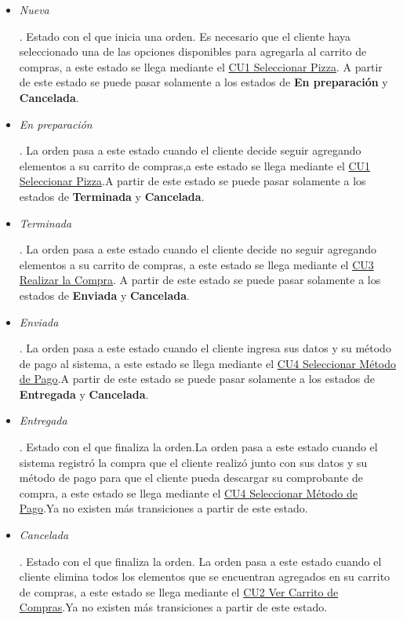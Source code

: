 		\begin{itemize}

			\item \hypertarget{cv:cs:edo:Nueva}{\textit{Nueva}}. Estado con el que inicia una orden. Es necesario que el cliente haya seleccionado una de las opciones disponibles para agregarla al carrito de compras, a este estado se llega mediante el \hyperlink{CU1}{CU1 Seleccionar Pizza}. A partir de este estado se puede pasar solamente a los estados de \textbf{En preparación} y \textbf{Cancelada}.

			\item \hypertarget{cv:cs:edo:EnPreparación}{\textit{En preparación}}. La orden pasa a este estado cuando el cliente decide seguir agregando elementos a su carrito de compras,a este estado se llega mediante el \hyperlink{CU1}{CU1 Seleccionar Pizza}.A partir de este estado se puede pasar solamente a los estados de \textbf{Terminada} y \textbf{Cancelada}.
			
			\item \hypertarget{cv:cs:edo:Terminada}{\textit{Terminada}}. La orden pasa a este estado cuando el cliente decide no seguir agregando elementos a su carrito de compras, a este estado se llega mediante el \hyperlink{CU3}{CU3 Realizar la Compra}. A partir de este estado se puede pasar solamente a los estados de \textbf{Enviada} y \textbf{Cancelada}.
			
			\item \hypertarget{cv:cs:edo:Enviada}{\textit{Enviada}}.  La orden pasa a este estado cuando el cliente ingresa sus datos y su método de pago al sistema, a este estado se llega mediante el  \hyperlink{CU4}{CU4 Seleccionar Método de Pago}.A partir de este estado se puede pasar solamente a los estados de \textbf{Entregada} y \textbf{Cancelada}.
			
			\item \hypertarget{cv:cs:edo:Entregada}{\textit{Entregada}}.  Estado con el que finaliza la orden.La orden pasa a este estado cuando el sistema registró la compra que el cliente realizó junto con sus datos y su método de pago para que el cliente pueda descargar su comprobante de compra, a este estado se llega mediante el \hyperlink{CU4}{CU4 Seleccionar Método de Pago}.Ya no existen más transiciones a partir de este estado.
			
			\item \hypertarget{cv:cs:edo:Cancelada}{\textit{Cancelada}}.  Estado con el que finaliza la orden. La orden pasa a este estado cuando el cliente elimina todos los elementos que se encuentran agregados en su carrito de compras, a este estado se llega mediante el \hyperlink{CU2}{CU2 Ver Carrito de Compras}.Ya no existen más transiciones a partir de este estado.
		\end{itemize}

